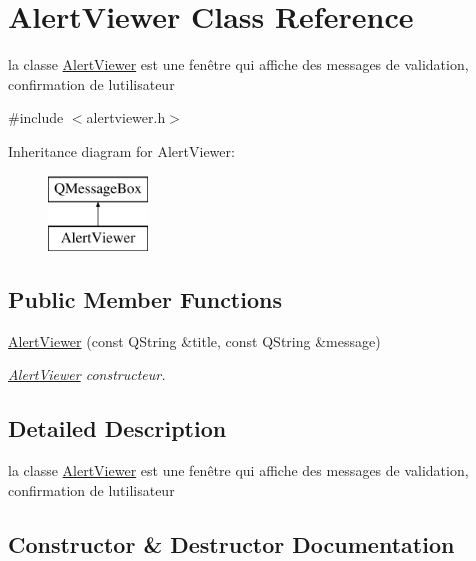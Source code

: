 \hypertarget{classAlertViewer}{}\section{Alert\+Viewer Class Reference}
\label{classAlertViewer}


la classe \hyperlink{classAlertViewer}{Alert\+Viewer} est une fenêtre qui affiche des messages de validation, confirmation de l\textquotesingle{}utilisateur  




{\ttfamily \#include $<$alertviewer.\+h$>$}

Inheritance diagram for Alert\+Viewer\+:\begin{figure}[H]
\begin{center}
\leavevmode
\includegraphics[height=2.000000cm]{classAlertViewer}
\end{center}
\end{figure}
\subsection*{Public Member Functions}
\begin{DoxyCompactItemize}
\item 
\hyperlink{classAlertViewer_ab92bf55659e74654c1690fd88726c4c0}{Alert\+Viewer} (const Q\+String \&title, const Q\+String \&message)
\begin{DoxyCompactList}\small\item\em \hyperlink{classAlertViewer}{Alert\+Viewer} constructeur. \end{DoxyCompactList}\end{DoxyCompactItemize}


\subsection{Detailed Description}
la classe \hyperlink{classAlertViewer}{Alert\+Viewer} est une fenêtre qui affiche des messages de validation, confirmation de l\textquotesingle{}utilisateur 

\subsection{Constructor \& Destructor Documentation}
\mbox{\label{classAlertViewer_ab92bf55659e74654c1690fd88726c4c0}} 
